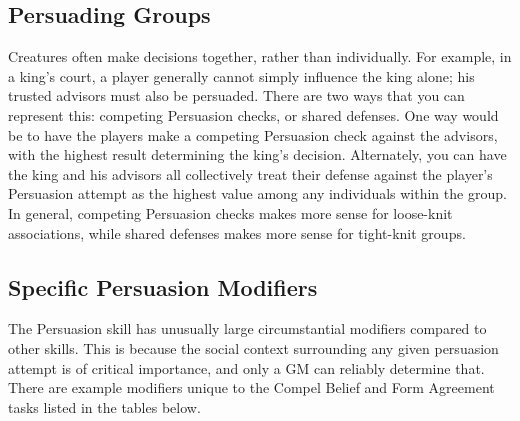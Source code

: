   \subsection{Persuading Groups}
    Creatures often make decisions together, rather than individually.
    For example, in a king's court, a player generally cannot simply influence the king alone; his trusted advisors must also be persuaded.
    There are two ways that you can represent this: competing Persuasion checks, or shared defenses.
    One way would be to have the players make a competing Persuasion check against the advisors, with the highest result determining the king's decision.
    Alternately, you can have the king and his advisors all collectively treat their defense against the player's Persuasion attempt as the highest value among any individuals within the group.
    In general, competing Persuasion checks makes more sense for loose-knit associations, while shared defenses makes more sense for tight-knit groups.

  \subsection{Specific Persuasion Modifiers}
    The Persuasion skill has unusually large circumstantial modifiers compared to other skills.
    This is because the social context surrounding any given persuasion attempt is of critical importance, and only a GM can reliably determine that.
    There are example modifiers unique to the Compel Belief and Form Agreement tasks listed in the tables below.

